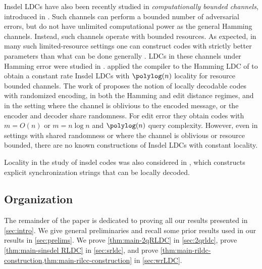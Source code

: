 Insdel LDCs have also been recently studied in {\em computationally bounded channels}, introduced in \cite{Lipton94}. Such channels can perform a bounded number of adversarial errors, but do not have unlimited computational power as the general Hamming channels. Instead, such channels operate with bounded resources.
As expected, in many such  limited-resource settings one can construct codes with strictly better parameters than what can be done generally \cite{GopalanLD04,MicaliPSW05, Guruswami_Smith:2016, ShaltielS16}. LDCs in these channels under Hamming error were studied in \cite{OPS07, HemenwayO08, HemenwayOSW11, HemenwayOW15, BlockiGGZ19,BlockiKZ19}. \cite{block2021private} applied the \cite{BlockBGKZ20} compiler to the Hamming LDC of \cite{BlockiKZ19} to obtain a constant rate Insdel LDCs with $\polylog(n)$ locality for resource bounded channels.  The work of \cite{ChengLZ20}  proposes the notion of locally decodable codes with randomized encoding, in both the Hamming and edit distance regimes, and in the setting where the channel is oblivious to the encoded message, or the encoder and decoder share randomness. For edit error they obtain codes with $m=O(n)$ or $m= n \log n$ and $\polylog(n)$ query complexity. However, even in settings with shared randomness or where the channel is oblivious or resource bounded, there are no known constructions of Insdel LDCs with constant locality.
 
Locality in the study of insdel codes was also considered in   \cite{HaeuplerS18}, which constructs explicit synchronization strings that can be locally decoded.





\subsection{Organization}
The remainder of the paper is dedicated to proving all our results presented in \cref{sec:intro}. %
We give general preliminaries and recall some prior results used in our results in \cref{sec:prelims}.
We prove \cref{thm:main-2qRLDC} in \cref{sec:2qrldc}, prove \cref{thm:main-sinsdel RLDC} in \cref{sec:srldc}, and prove \cref{thm:main-rildc-construction,thm:main-rilcc-construction} in \cref{sec:wrLDC}.


